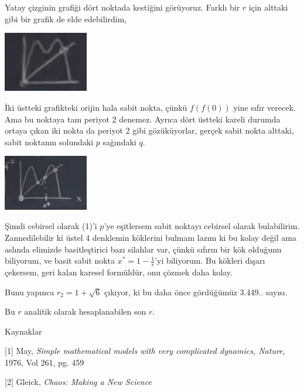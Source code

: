 \documentclass[12pt,fleqn]{article}\usepackage{../../common}
\begin{document}
Yatay çizginin grafiği dört noktada kestiğini görüyoruz. Farklı bir $r$
için alttaki gibi bir grafik de elde edebilirdim,

\includegraphics[width=10em]{19_17.png}

İki üstteki grafikteki orijin hala sabit nokta, çünkü $f(f(0))$ yine sıfır
verecek. Ama bu noktaya tam periyot 2 denemez. Ayrıca dört üstteki kareli
durumda ortaya çıkan iki nokta da periyot 2 gibi gözüküyorlar, gerçek sabit
nokta alttaki, sabit noktanın solundaki $p$ sağındaki $q$. 

\includegraphics[width=10em]{19_18.png}

Şimdi cebirsel olarak (1)'i $p$'ye eşitlersem sabit noktayı cebirsel olarak
bulabilirim. Zannedilebilir ki üstel 4 denklemin köklerini bulmam lazım ki
bu kolay değil ama aslında elimizde basitleştirici bazı silahlar var, çünkü
sıfırın bir kök olduğunu biliyorum, ve basit sabit nokta
$x^* = 1-\frac{1}{r}$'yi biliyorum. Bu kökleri dışarı çekersem, geri kalan
karesel formüldür, onu çözmek daha kolay.

Bunu yapınca $r_2 = 1+\sqrt{6}$ çıkıyor, ki bu daha önce gördüğümüz
3.449.. sayısı.

Bu $r$ analitik olarak hesaplanabilen son $r$. 

Kaynaklar

[1] May, {\em Simple mathematical models with very complicated dynamics, Nature}, 1976, Vol 261, pg. 459

[2] Gleick, {\em Chaos: Making a New Science}
\end{document}
